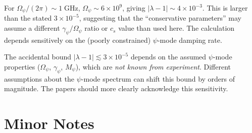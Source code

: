 \documentclass[12pt,a4paper]{article}
\begin{document}
For $\Omega_\psi/(2\pi) \sim 1\;\text{GHz}$, $\Omega_\psi \sim 6\times 10^9$,
giving $|\lambda - 1| \sim 4\times 10^{-3}$. This is larger than the
stated $3\times 10^{-5}$, suggesting that the ``conservative parameters''
may assume a different $\gamma_\psi/\Omega_\psi$ ratio or $c_s$ value than
used here. The calculation depends sensitively on the (poorly constrained)
$\psi$-mode damping rate.

\begin{moderate}
The accidental bound $|\lambda - 1| \lesssim 3\times 10^{-5}$ depends on
the assumed $\psi$-mode properties ($\Omega_\psi$, $\gamma_\psi$, $M_\psi$),
which are \textit{not known from experiment}. Different assumptions about
the $\psi$-mode spectrum can shift this bound by orders of magnitude. The
papers should more clearly acknowledge this sensitivity.
\end{moderate}

\section{Minor Notes}
\label{sec:minor}
\end{document}
